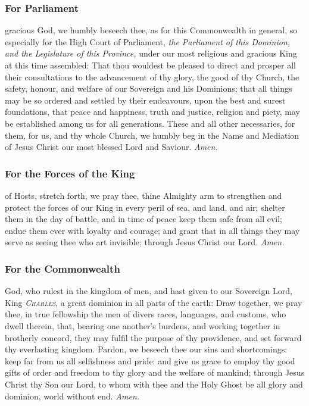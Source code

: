 \subsubsection{For Parliament}
 gracious God, we humbly beseech thee, as for this Commonwealth in general, so especially for the High Court of Parliament, \textit{the Parliament of this Dominion, and the Legislature of this Province,} under our most religious and gracious King at this time assembled: That thou wouldest be pleased to direct and prosper all their consultations to the advancement of thy glory, the good of thy Church, the safety, honour, and welfare of our Sovereign and his Dominions; that all things may be so ordered and settled by their endeavours, upon the best and surest foundations, that peace and happiness, truth and justice, religion and piety, may be established among us for all generations. These and all other necessaries, for them, for us, and thy whole Church, we humbly beg in the Name and Mediation of Jesus Christ our most blessed Lord and Saviour. \textit{Amen.}

\clearpage
\subsubsection{For the Forces of the King}
 of Hosts, stretch forth, we pray thee, thine Almighty arm to strengthen and protect the forces of our King in every peril of sea, and land, and air; shelter them in the day of battle, and in time of peace keep them safe from all evil; endue them ever with loyalty and courage; and grant that in all things they may serve as seeing thee who art invisible; through Jesus Christ our Lord. \textit{Amen.}

\subsubsection{For the Commonwealth}
 God, who rulest in the kingdom of men, and hast given to our Sovereign Lord, King \textsc{\textit{Charles}}, a great dominion in all parts of the earth: Draw together, we pray thee, in true fellowship the men of divers races, languages, and customs, who dwell therein, that, bearing one another's burdens, and working together in brotherly concord, they may fulfil the purpose of thy providence, and set forward thy everlasting kingdom. Pardon, we beseech thee our sins and shortcomings: keep far from us all selfishness and pride: and give us grace to employ thy good gifts of order and freedom to thy glory and the welfare of mankind; through Jesus Christ thy Son our Lord, to whom with thee and the Holy Ghost be all glory and dominion, world without end. \textit{Amen.}

